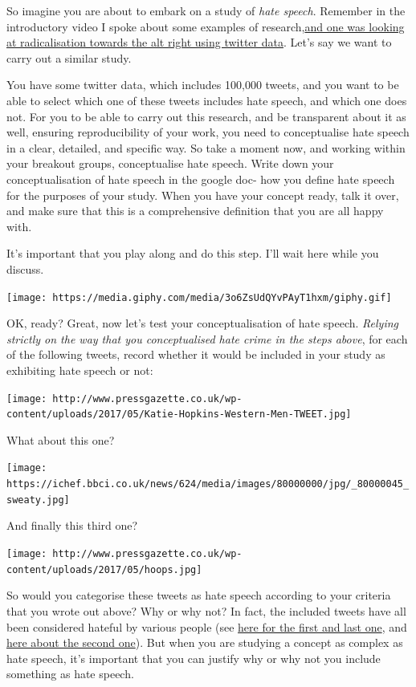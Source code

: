 \documentclass[
]{book}
\begin{document}
So imagine you are about to embark on a study of \emph{hate speech}. Remember in the introductory video I spoke about some examples of research,\href{https://www.washingtonpost.com/news/the-intersect/wp/2016/09/26/these-charts-show-exactly-how-racist-and-radical-the-alt-right-has-gotten-this-year/?noredirect=on\&utm_term=.aeb311ab060c}{and one was looking at radicalisation towards the alt right using twitter data}. Let's say we want to carry out a similar study.

You have some twitter data, which includes 100,000 tweets, and you want to be able to select which one of these tweets includes hate speech, and which one does not. For you to be able to carry out this research, and be transparent about it as well, ensuring reproducibility of your work, you need to conceptualise hate speech in a clear, detailed, and specific way. So take a moment now, and working within your breakout groups, conceptualise hate speech. Write down your conceptualisation of hate speech in the google doc- how you define hate speech for the purposes of your study. When you have your concept ready, talk it over, and make sure that this is a comprehensive definition that you are all happy with.

It's important that you play along and do this step. I'll wait here while you discuss.

\texttt{[image: https://media.giphy.com/media/3o6ZsUdQYvPAyT1hxm/giphy.gif]}

OK, ready? Great, now let's test your conceptualisation of hate speech. \emph{Relying strictly on the way that you conceptualised hate crime in the steps above}, for each of the following tweets, record whether it would be included in your study as exhibiting hate speech or not:

\texttt{[image: http://www.pressgazette.co.uk/wp-content/uploads/2017/05/Katie-Hopkins-Western-Men-TWEET.jpg]}

What about this one?

\texttt{[image: https://ichef.bbci.co.uk/news/624/media/images/80000000/jpg/\_80000045\_sweaty.jpg]}

And finally this third one?

\texttt{[image: http://www.pressgazette.co.uk/wp-content/uploads/2017/05/hoops.jpg]}

So would you categorise these tweets as hate speech according to your criteria that you wrote out above? Why or why not? In fact, the included tweets have all been considered hateful by various people (see \href{http://www.pressgazette.co.uk/katie-hopkins-leaving-lbc-radio-effective-immediately-station-announces/}{here for the first and last one}, and \href{http://www.bbc.co.uk/news/uk-scotland-glasgow-west-30641705}{here about the second one}). But when you are studying a concept as complex as hate speech, it's important that you can justify why or why not you include something as hate speech.
\end{document}
